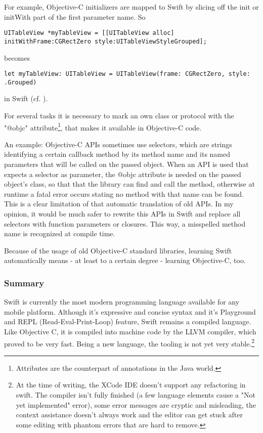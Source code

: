 For example, Objective-C initializers are mapped to Swift by slicing off the init or initWith part of the first parameter name. So

\begin{lstlisting}[frame=none]
UITableView *myTableView = [[UITableView alloc] initWithFrame:CGRectZero style:UITableViewStyleGrouped];
\end{lstlisting}
becomes
\begin{lstlisting}[frame=none]
let myTableView: UITableView = UITableView(frame: CGRectZero, style: .Grouped)
\end{lstlisting}
in Swift (cf. \cite{swift-objc-book}).

For several tasks it is necessary to mark an own class or protocol with the "@objc" attribute\footnote{Attributes are the counterpart of annotations in the Java world.}, that makes it available in Objective-C code. 

An example: Objective-C APIs sometimes use selectors, which are strings identifying a certain callback method by its method name and its named parameters that will be called on the passed object.
When an API is used that expects a selector as parameter, the @objc attribute is needed on the passed object's class, so that that the library can find and call the method, otherwise at runtime a fatal error occurs stating no method with that name can be found.
This is a clear limitation of that automatic translation of old APIs. In my opinion, it would be much safer to rewrite this APIs in Swift and replace all selectors with function parameters or closures. This way, a misspelled method name is recognized at compile time.

Because of the usage of old Objective-C standard libraries, learning Swift automatically means - at least to a certain degree - learning Objective-C, too. 

\subsubsection{Summary}

Swift is currently the most modern programming language available for any mobile platform. Although it's expressive and concise syntax and it's Playground and REPL (Read-Eval-Print-Loop) feature, Swift remains a compiled language. Like Objective C, it is compiled into machine code by the LLVM compiler, which proved to be very fast. Being a new language, the tooling is not yet very stable.\footnote{At the time of writing, the XCode IDE doesn't support any refactoring in swift. The compiler isn't fully finished (a few language elements cause a "Not yet implemented" error), some error messages are cryptic and misleading, the context assistance doesn't always work and the editor can get stuck after some editing with phantom errors that are hard to remove.}

